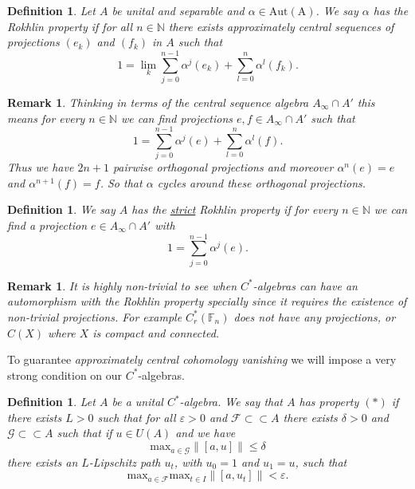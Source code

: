 \documentclass[11pt,a4paper,oneside]{amsart}
\newtheorem{remark}[theorem]{Remark}
\newtheorem{definition}[theorem]{Definition}
\newcommand{\norm}[1]{\left\|#1\right\|} %
\begin{document}
\begin{tcolorbox}[colback= LimeGreen! 50]
\begin{definition}
\label{Rokklin prop}
Let $A$ be unital and separable and $\alpha \in \mathrm{Aut(A)}$. We say $\alpha$ has the Rokhlin property if for all $n\in \mathbb{N}$ there exists approximately central sequences of projections $(e_k)$ and $(f_k)$ in $A$ such that $$1=\lim_{k} \sum_{j=0}^{n-1}\alpha^j(e_k)+\sum_{l=0}^{n}\alpha^l(f_k).$$
\end{definition}
\end{tcolorbox}

\begin{remark}
Thinking in terms of the central sequence algebra $A_\infty\cap A'$ this means for every $n\in \mathbb{N}$  we can find projections $e,f\in A_\infty\cap A'$ such that $$1=\sum_{j=0}^{n-1}\alpha^j(e)+\sum_{l=0}^{n}\alpha^l(f).$$ Thus we have $2n+1$ pairwise orthogonal projections and moreover $\alpha^n(e)=e$ and $\alpha^{n+1}(f)=f$. So that $\alpha$ cycles around these orthogonal projections. 
\end{remark}

\begin{tcolorbox}[colback= LimeGreen! 50]
\begin{definition}
We say $A$ has the \underline{strict} Rokhlin property if for every $n\in \mathbb{N}$ we can find a projection $e\in A_\infty\cap A'$ with $$1=\sum_{j=0}^{n-1}\alpha^{j}(e).$$
\end{definition}
\end{tcolorbox}
\begin{remark}
It is highly non-trivial to see when $C^*$-algebras can have an automorphism with the Rokhlin property specially since it requires the existence of non-trivial projections. For example $C_r^*(\mathbb{F}_n)$ does not have any projections, or $C(X)$ where $X$ is compact and connected. 
\end{remark}

To guarantee \textit{approximately central cohomology vanishing} we will impose a very strong condition on our $C^*$-algebras. 

\begin{tcolorbox}[colback= LimeGreen! 50]
\begin{definition}
\label{prop (*)}
Let $A$ be a unital $C^*$-algebra. We say that $A$ has property $(*)$ if there exists $L>0$ such that for all $\varepsilon>0$ and $\mathcal F\subset\subset A$ there exists $\delta>0$ and $\mathcal G \subset \subset A$ such that if $u\in U(A)$ and we have $$\mathrm{max}_{a\in \mathcal G}\norm{[a,u]}\leq \delta$$ there exists an $L$-Lipschitz path $u_t$, with $u_0=1$ and $u_1=u$, such that $$\mathrm{max}_{a\in \mathcal F}\mathrm{max}_{t\in I}\norm{[a,u_t]}<\varepsilon.$$
\end{definition}
\end{tcolorbox}
\end{document}

